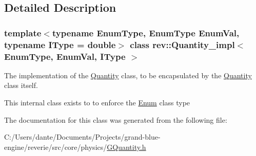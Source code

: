 \subsection{Detailed Description}
\subsubsection*{template$<$typename Enum\+Type, Enum\+Type Enum\+Val, typename I\+Type = double$>$\newline
class rev\+::\+Quantity\+\_\+impl$<$ Enum\+Type, Enum\+Val, I\+Type $>$}

The implementation of the \mbox{\hyperlink{classrev_1_1_quantity}{Quantity}} class, to be encapsulated by the \mbox{\hyperlink{classrev_1_1_quantity}{Quantity}} class itself. 

This internal class exists to to enforce the \mbox{\hyperlink{struct_enum}{Enum}} class type 

The documentation for this class was generated from the following file\+:\begin{DoxyCompactItemize}
\item 
C\+:/\+Users/dante/\+Documents/\+Projects/grand-\/blue-\/engine/reverie/src/core/physics/\mbox{\hyperlink{_g_quantity_8h}{G\+Quantity.\+h}}\end{DoxyCompactItemize}
